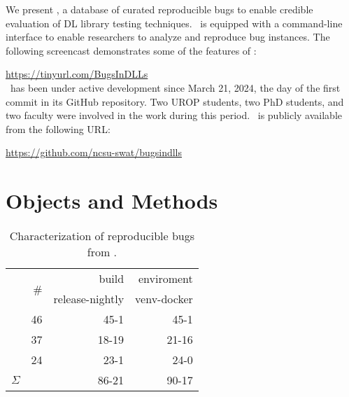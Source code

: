 \documentclass[sigconf,screen]{acmart}
\begin{document}

We present \tname, a database of curated reproducible bugs to
enable credible evaluation of DL library testing techniques. \tname\ is
equipped with a command-line interface to enable researchers to analyze
and reproduce bug instances. The following screencast demonstrates some
of the features of \tname:

\url{https://tinyurl.com/BugsInDLLs}\\

\tname\ has been under active development since March 21, 2024, the
day of the first commit in its GitHub repository. Two UROP students,
two PhD students, and two faculty were involved in the work during
this period. \tname\ is publicly available from the following URL:

\url{https://github.com/ncsu-swat/bugsindlls}


\section{Objects and Methods}

\begin{table}
  \centering
  \caption{\label{table:bug-characterization}Characterization of
    reproducible bugs from \tname.}
\begin{tabular}{l|rrr}
  \toprule & \multirow{2}{*}{\#} & \multicolumn{1}{r}{build} &
  \multicolumn{1}{r}{enviroment} \\ & & release-nightly & venv-docker
  \\ \cmidrule(lr){2-4} \jax{} & 46 & 45-1 & 45-1 \\ \torch{} & 37 &
  18-19 & 21-16 \\ \tf{} & 24 & 23-1 & 24-0 \\ \midrule
  \multicolumn{1}{c|}{$\Sigma$} & \numbugs{} & 86-21& 90-17
  \\ \bottomrule
\end{tabular}
\end{table}
\end{document}
